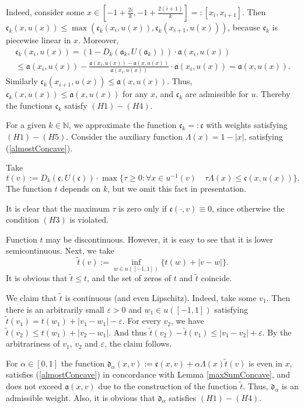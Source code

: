 \documentclass[12pt]{article}
\newcommand{\Nat}{\mathbb N}
\newcommand{\abs}[1]{\left\vert#1\right\vert}
\newcommand{\eps}{\varepsilon}
\renewcommand{\ge}{\geqslant}
\renewcommand{\le}{\leqslant}
\begin{document}
Indeed, consider some
$x \in [-1 + \frac{2i}{k}, -1 + \frac{2(i + 1)}{k}] =: [x_i, x_{i + 1}]$.
Then $\mathfrak c_k(x, u(x)) \le \max( \mathfrak c_k(x_i, u(x)), \mathfrak c_k(x_{i + 1}, u(x)) )$, because
$\mathfrak c_k$ is piecewise linear in $x$. Moreover,
\begin{multline*}
\mathfrak c_k(x_i, u(x)) = ( 1 - D_k(\mathfrak a_k, U(\mathfrak a_k))) \cdot \mathfrak a(x_i, u(x)) \\
\le \mathfrak a(x_i, u(x)) - \frac{\mathfrak a(x_i, u(x)) - \mathfrak a(x, u(x))}{\mathfrak a(x_i, u(x))} \cdot \mathfrak a(x_i, u(x)) = \mathfrak a(x, u(x)).
\end{multline*}
Similarly $\mathfrak c_k(x_{i + 1}, u(x)) \le \mathfrak a(x, u(x))$.
Thus, $\mathfrak c_k(x, u(x)) \le \mathfrak a(x, u(x))$ for any $x$, and $\mathfrak c_k$ are admissible for $u$.
Thereby the functions $\mathfrak c_k$ satisfy $(H1)-(H4)$.

For a given $k \in \Nat$, we approximate the function $\mathfrak c_k =: \mathfrak c$ with weights satisfying $(H1)-(H5)$.
Consider the auxiliary function $\Lambda(x) = 1 - \abs{x}$, satisfying (\ref{almostConcave}).

Take
$$t(v):=D_k(\mathfrak c, U(\mathfrak c)) \cdot \max\{\tau \ge 0: \forall x \in u^{-1}(v) \quad \tau \Lambda(x) \le \mathfrak c(x, u(x))\}.$$
The function $t$ depends on $k$, but we omit this fact in presentation.

It is clear that the maximum $\tau$ is zero only if $\mathfrak c(\cdot, v) \equiv 0$,
since otherwise the condition $(H3)$ is violated.

Function $t$ may be discontinuous. However, it is easy to see that it is lower semicontinuous.
Next, we take
$$\tilde{t}(v) := \inf_{w \in u([-1, 1])} \{t(w) + |v - w|\}.$$
It is obvious that $\tilde{t} \le t$, and the set of zeros of $t$ and $\tilde{t}$ coincide.

We claim that $\tilde{t}$ is continuous (and even Lipschitz).
Indeed, take some $v_1$.
Then there is an arbitrarily small $\eps > 0$ and $w_1 \in u([-1, 1])$
satisfying $\tilde{t}(v_1) = t(w_1) + |v_1 - w_1| - \eps$.
For every $v_2$, we have $\tilde{t}(v_2) \le t(w_1) + |v_2 - w_1|$.
And thus $\tilde{t}(v_2) - \tilde{t}(v_1) \le |v_1 - v_2| + \eps$.
By the arbitrariness of $v_1$, $v_2$ and $\eps$, the claim follows.

For $\alpha \in [0, 1]$ the function $\mathfrak d_\alpha(x, v) := \mathfrak c(x, v) + \alpha \Lambda(x) \tilde{t}(v)$
is even in $x$, satisfies (\ref{almostConcave}) in concordance with Lemma \ref{maxSumConcave},
and does not exceed $\mathfrak a(x, v)$ due to the construction of the function $\tilde{t}$.
Thus, $\mathfrak d_\alpha$ is an admissible weight.
Also, it is obvious that $\mathfrak d_\alpha$ satisfies $(H1)-(H4)$.
\end{document}
